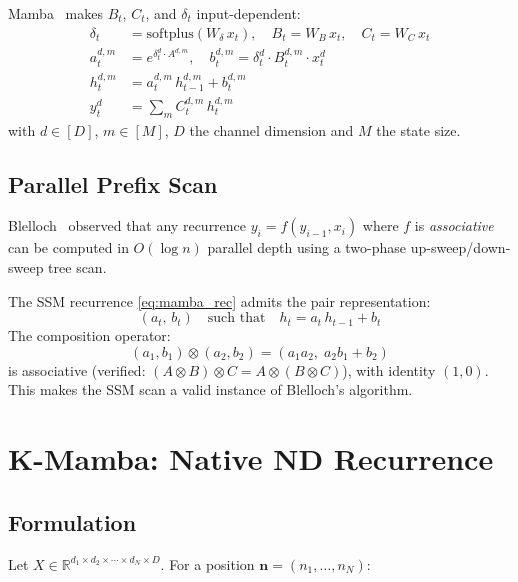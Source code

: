 \documentclass[10pt,twocolumn]{article}
\begin{document}
Mamba~\cite{mamba2023} makes $B_t$, $C_t$, and $\delta_t$ input-dependent:
\begin{align}
  \delta_t &= \text{softplus}(W_\delta\, x_t), \quad
  B_t = W_B\, x_t, \quad
  C_t = W_C\, x_t \\
  a_t^{d,m} &= e^{\delta_t^d \cdot A^{d,m}}, \quad
  b_t^{d,m}  = \delta_t^d \cdot B_t^{d,m} \cdot x_t^d \label{eq:mamba_ab}\\
  h_t^{d,m} &= a_t^{d,m}\,h_{t-1}^{d,m} + b_t^{d,m} \label{eq:mamba_rec}\\
  y_t^d     &= \textstyle\sum_m C_t^{d,m}\,h_t^{d,m} \label{eq:mamba_out}
\end{align}
with $d \in [D]$, $m \in [M]$, $D$ the channel dimension and $M$ the state size.

\subsection{Parallel Prefix Scan}
\label{sec:blelloch_bg}

Blelloch~\cite{blelloch1990} observed that any recurrence
$y_i = f(y_{i-1}, x_i)$ where $f$ is \emph{associative} can be
computed in $O(\log n)$ parallel depth using a two-phase
up-sweep/down-sweep tree scan.

The SSM recurrence \eqref{eq:mamba_rec} admits the pair representation:
\begin{equation}
  (a_t,\, b_t) \quad\text{such that}\quad h_t = a_t\,h_{t-1} + b_t
\end{equation}
The composition operator:
\begin{equation}
  \boxed{(a_1, b_1) \otimes (a_2, b_2) = (a_1 a_2,\; a_2 b_1 + b_2)}
  \label{eq:monoid}
\end{equation}
is associative (verified: $(A \otimes B) \otimes C = A \otimes (B \otimes C)$),
with identity $(1, 0)$.
This makes the SSM scan a valid instance of Blelloch's algorithm.

\section{K-Mamba: Native ND Recurrence}
\label{sec:theory}

\subsection{Formulation}

Let $X \in \mathbb{R}^{d_1 \times d_2 \times \cdots \times d_N \times D}$.
For a position $\mathbf{n} = (n_1, \ldots, n_N)$:
\end{document}

